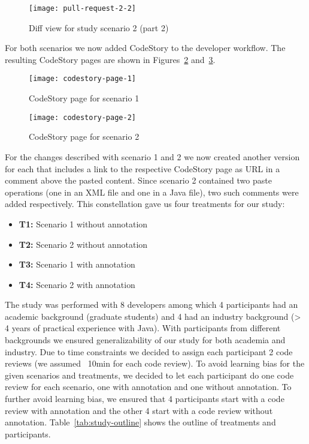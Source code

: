 \documentclass[../manifest.tex]{subfiles}
\begin{document}
\begin{figure}[h]
  \centering
  \texttt{[image: pull-request-2-2]}
  \caption{Diff view for study scenario 2 (part 2)}
  \label{fig:pull-request-2-2}
\end{figure}

For both scenarios we now added CodeStory to the developer workflow. The resulting CodeStory pages are shown in Figures~\ref{fig:codestory-page-1} and~\ref{fig:codestory-page-2}.

\begin{figure}[h]
  \centering
  \texttt{[image: codestory-page-1]}
  \caption{CodeStory page for scenario 1}
  \label{fig:codestory-page-1}
\end{figure}

\begin{figure}[h]
  \centering
  \texttt{[image: codestory-page-2]}
  \caption{CodeStory page for scenario 2}
  \label{fig:codestory-page-2}
\end{figure}

For the changes described with scenario 1 and 2 we now created another version for each that includes a link to the respective CodeStory page as URL in a comment above the pasted content. Since scenario 2 contained two paste operations (one in an XML file and one in a Java file), two such comments were added respectively. This constellation gave us four treatments for our study:
\begin{itemize}
  \item \textbf{T1:} Scenario 1 without annotation
  \item \textbf{T2:} Scenario 2 without annotation
  \item \textbf{T3:} Scenario 1 with annotation
  \item \textbf{T4:} Scenario 2 with annotation
\end{itemize}

The study was performed with 8 developers among which 4 participants had an academic background (graduate students) and 4 had an industry background (> 4 years of practical experience with Java). With participants from different backgrounds we ensured generalizability of our study for both academia and industry. Due to time constraints we decided to assign each participant 2 code reviews (we assumed ~10min for each code review). To avoid learning bias for the given scenarios and treatments, we decided to let each participant do one code review for each scenario, one with annotation and one without annotation. To further avoid learning bias, we ensured that 4 participants start with a code review with annotation and the other 4 start with a code review without annotation. Table~\ref{tab:study-outline} shows the outline of treatments and participants.
\end{document}

